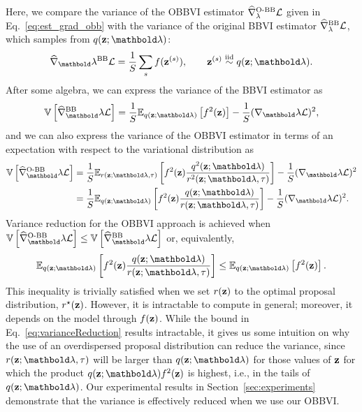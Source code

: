 \documentclass[]{article}
\begin{document}
Here, we compare the variance of the \gls{OBBVI} estimator
$\widehat{\nabla}^{\textrm{O-BB}}_\lambda \mathcal{L}$ given in
Eq.~\ref{eq:est_grad_obb} with the variance of the original \gls{BBVI}
estimator $\widehat{\nabla}^{\textrm{BB}}_\lambda \mathcal{L}$, which samples
from $q(\bz;\blambda)$:
\begin{align}
    \widehat{\nabla}_\blambda^{\textrm{BB}} \Lcal = \frac{1}{S}\sum_s f(\bz^{(s)}), \qquad \bz^{(s)}\stackrel{\textrm{iid}}{\sim} q(\bz;\blambda).
\end{align}
After some algebra, we can express the variance of the \gls{BBVI} estimator as
\begin{equation}
    \Var{\widehat{\nabla}^{\textrm{BB}}_\blambda \Lcal} = \frac{1}{S}\E{q(\bz;\blambda)}{f^2(\bz)}-\frac{1}{S}(\nabla_\blambda\Lcal)^2,
\end{equation}
and we can also express the variance of the \gls{OBBVI} estimator in terms of an expectation with respect to the variational distribution as
\begin{equation}\label{eq:varL2}
  \begin{split}
    \Var{\widehat{\nabla}^{\textrm{O-BB}}_\blambda \Lcal} & = \frac{1}{S}\E{r(\bz;\blambda,\tau)}{f^2(\bz)\frac{q^2(\bz;\blambda)}{r^2(\bz;\blambda,\tau)}}-\frac{1}{S}(\nabla_\blambda\Lcal)^2\\
    & = \frac{1}{S}\E{q(\bz;\blambda)}{f^2(\bz)\frac{q(\bz;\blambda)}{r(\bz;\blambda,\tau)}}-\frac{1}{S}(\nabla_\blambda\Lcal)^2.
  \end{split}
\end{equation}
Variance reduction for the \gls{OBBVI} approach is achieved when $\Var{\widehat{\nabla}^{\textrm{O-BB}}_\blambda \Lcal}\leq \Var{\widehat{\nabla}^{\textrm{BB}}_\blambda \Lcal}$ or, equivalently,
\begin{equation}\label{eq:varianceReduction}
  \E{q(\bz;\blambda)}{f^2(\bz)\frac{q(\bz;\blambda)}{r(\bz;\blambda,\tau)}}\leq \E{q(\bz;\blambda)}{f^2(\bz)}.
\end{equation}
This inequality is trivially satisfied when we set $r(\mathbf{z})$ to the optimal proposal distribution, $r^{\star}(\mathbf{z})$. However, it is intractable to compute in general; moreover, it depends on the model through $f(\mathbf{z})$. While the bound in Eq.~\ref{eq:varianceReduction} results intractable, it gives us some intuition on why the use of an overdispersed proposal distribution can reduce the variance, since $r(\bz;\blambda,\tau)$ will be larger than $q(\bz;\blambda)$ for those values of $\mathbf{z}$ for which the product $q(\bz;\blambda)f^2(\bz)$ is highest, i.e., in the tails of $q(\bz;\blambda)$. Our experimental results in Section~\ref{sec:experiments} demonstrate that the variance is effectively reduced when we use our \gls{OBBVI}.
\end{document}
